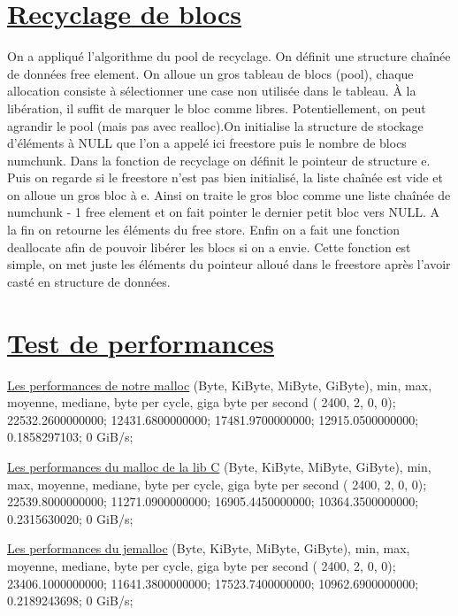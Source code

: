 \documentclass[12pt]{article}
\begin{document}
\section{ \underline{Recyclage de blocs}}
{\Large On a appliqué l'algorithme du pool de recyclage. On définit une structure chaînée de données free element. On alloue un gros tableau de blocs (pool), chaque allocation consiste à sélectionner une case non utilisée dans le tableau. À la libération, il suffit de marquer le bloc comme libres. Potentiellement, on peut agrandir le pool (mais pas avec realloc).On initialise la structure de stockage d'éléments à NULL que l'on a appelé ici freestore puis le nombre de blocs numchunk. Dans la fonction de recyclage on définit le pointeur de structure e. Puis on regarde si le freestore n'est pas bien initialisé, la liste chaînée est vide et on alloue un gros bloc à e. Ainsi on traite le gros bloc comme une liste chaînée de numchunk - 1 free element et on fait pointer le dernier petit bloc vers NULL. A la fin on retourne les éléments du free store. Enfin on a fait une fonction deallocate afin de pouvoir libérer les blocs si on a envie. Cette fonction est simple, on met juste les éléments du pointeur alloué dans le freestore après l'avoir casté en structure de données.}

\section{ \underline{Test de performances}}
\underline{Les performances de notre malloc}\newline
(Byte, KiByte, MiByte, GiByte), min, max, moyenne, mediane, byte per cycle, giga byte per second \newline
(      2400,          2,          0, 0);	    22532.2600000000;	    12431.6800000000;	    17481.9700000000;	    12915.0500000000;	        0.1858297103;	                   0 GiB/s;

\underline{Les performances du malloc de la lib C}\newline
(Byte, KiByte, MiByte, GiByte), min, max, moyenne, mediane, byte per cycle, giga byte per second \newline
(      2400,          2,          0, 0);	    22539.8000000000;	    11271.0900000000;	    16905.4450000000;	    10364.3500000000;	        0.2315630020;	                   0 GiB/s;

\underline{Les performances du jemalloc}
(Byte, KiByte, MiByte, GiByte), min, max, moyenne, mediane, byte per cycle, giga byte per second \newline
(      2400,          2,          0, 0);	    23406.1000000000;	    11641.3800000000;	    17523.7400000000;	    10962.6900000000;	        0.2189243698;	                   0 GiB/s; \newline
\end{document}
